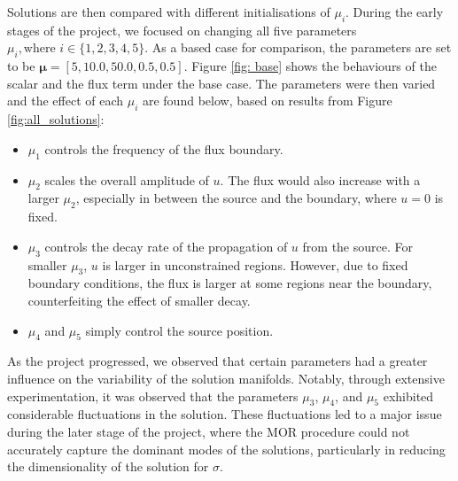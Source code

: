 Solutions are then compared with different initialisations of $\mu_i$. During the early stages of the project, we focused on changing all five parameters $\mu_i, \text{where } i \in \{1, 2, 3, 4, 5\}$.  As a based case for comparison, the parameters are set to be $\bm{\mu} = [5, 10.0, 50.0, 0.5, 0.5]$. Figure \ref{fig: base} shows the behaviours of the scalar and the flux term under the base case. The parameters were then varied and the effect of each $\mu_i$ are found below, based on results from Figure \ref{fig:all_solutions}:

\begin{itemize}
    \item $\mu_1$ controls the frequency of the flux boundary.   
    \item $\mu_2$ scales the overall amplitude of $u$. The flux would also increase with a  larger $\mu_2$, especially in between the source and the boundary, where $u = 0$ is fixed. 
    \item $\mu_3$ controls the decay rate of the propagation of $u$ from the source. For smaller $\mu_3$, $u$ is larger in unconstrained regions. However, due to fixed boundary conditions, the flux is larger at some regions near the boundary, counterfeiting the effect of smaller decay.  
    \item $\mu_4$ and $\mu_5$ simply control the source position. 

\end{itemize}

As the project progressed, we observed that certain parameters had a greater influence on the variability of the solution manifolds. Notably, through extensive experimentation, it was observed that the parameters $\mu_3$, $\mu_4$, and $\mu_5$ exhibited considerable fluctuations in the solution. These fluctuations led to a major issue during the later stage of the project, where the MOR procedure could not accurately capture the dominant modes of the solutions, particularly in reducing the dimensionality of the solution for $\sigma$. 

